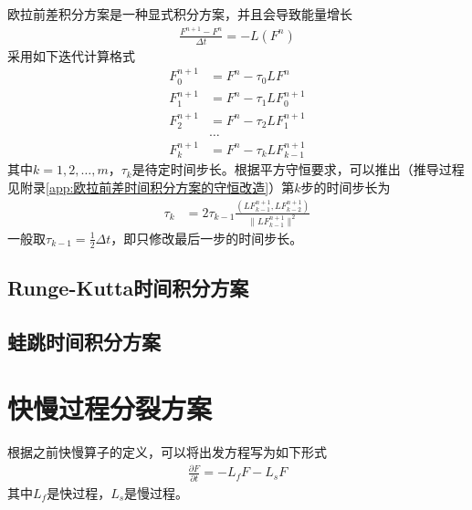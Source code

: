 \documentclass{ctexart}
\begin{document}
欧拉前差积分方案是一种显式积分方案，并且会导致能量增长
\begin{align}
  \frac{F^{n+1} - F^n}{\Delta{t}} = - L \left( F^n \right)
\end{align}
采用如下迭代计算格式
\begin{align*}
  F_0^{n+1} & = F^n - \tau_0 L F^n \\
  F_1^{n+1} & = F^n - \tau_1 L F_0^{n+1} \\
  F_2^{n+1} & = F^n - \tau_2 L F_1^{n+1} \\
  & \dots \\
  F_k^{n+1} & = F^n - \tau_k L F_{k-1}^{n+1}
\end{align*}
其中$k = 1, 2, \dots, m$，$\tau_k$是待定时间步长。根据平方守恒要求，可以推出（推导过程见附录\ref{app:欧拉前差时间积分方案的守恒改造}）第$k$步的时间步长为
\begin{align}
  \tau_k & = 2 \tau_{k-1} \frac{\left( L F_{k-1}^{n+1}, L F_{k-2}^{n+1} \right)}{\lVert L F_{k-1}^{n+1} \rVert^2}
\end{align}
一般取$\tau_{k-1} = \frac{1}{2} \Delta{t}$，即只修改最后一步的时间步长。

\subsection{Runge-Kutta时间积分方案}

\subsection{蛙跳时间积分方案}

\section{快慢过程分裂方案}

根据之前快慢算子的定义，可以将出发方程写为如下形式
\begin{align}
  \frac{\partial F}{\partial t} = - L_f F - L_s F
\end{align}
其中$L_f$是快过程，$L_s$是慢过程。
\end{document}
